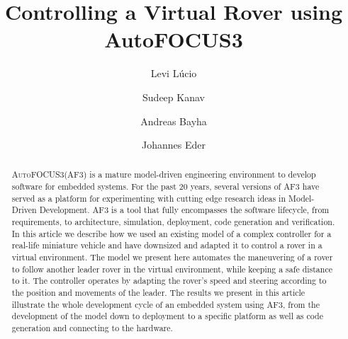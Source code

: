\documentclass[runningheads]{llncs}
\newcommand{\af}{\textsc{AF3}\xspace}
\newcommand{\autofocus}{\textsc{AutoFOCUS3}\xspace}
\begin{document}
 
% 
\title{Controlling a Virtual Rover using AutoFOCUS3}
%
%
\author{Levi L\'ucio \and
Sudeep Kanav \and Andreas Bayha \and Johannes Eder} 
%
%
%
\maketitle              %
%
\begin{abstract}
\autofocus (\af) is a mature model-driven engineering environment to develop
software for embedded systems. For the past 20 years, several versions of \af
have served as a platform for experimenting with cutting edge research ideas in
Model-Driven Development.
\af is a tool that fully encompasses the software lifecycle, from requirements,
to architecture, simulation, deployment, code generation and verification. In
this article we describe how we used an existing model of a complex controller
for a real-life miniature vehicle and have downsized and adapted it to control a rover in a
virtual environment. The model we present here automates the maneuvering
of a rover to follow another leader rover in the virtual environment, while
keeping a safe distance to it. The controller operates by adapting the rover's
speed and steering according to the position and movements of the leader.
The results we present in this article illustrate the whole development cycle of
an embedded system using \af, from the development of the model down to
deployment to a specific platform as well as code generation and connecting to
the hardware.
 
\end{abstract}
  




  

  
 


 

 

\end{document}
